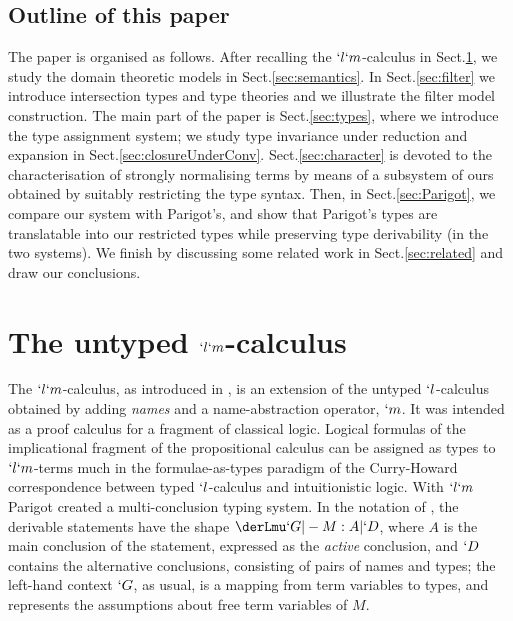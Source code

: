 \documentclass{CSML}
\begin{document}
 \subsection*{Outline of this paper}
The paper is organised as follows. 
After recalling the $`l`m$-calculus in Sect.\skp\ref{sec:calculus}, we study the domain theoretic models in Sect.\skp\ref{sec:semantics}. 
In Sect.\skp\ref{sec:filter} we introduce intersection types and type theories and we illustrate the filter model construction.
The main part of the paper is Sect.\skp\ref{sec:types}, where we introduce the type assignment system; we study type invariance under reduction and expansion in Sect.\skp\ref{sec:closureUnderConv}.
Sect.\skp\ref{sec:character} is devoted to the characterisation of strongly normalising terms by means of a subsystem of ours obtained by suitably restricting the type syntax. 
Then, in Sect.\skp\ref{sec:Parigot}, we compare our system with Parigot's, and show that Parigot's types are translatable into our restricted types while preserving type derivability (in the two systems). 
We finish by discussing some related work in Sect.\skp\ref{sec:related} and draw our conclusions. 

% 

 \section{The untyped \texorpdfstring{$`l`m$}{lambda-mu}-calculus} \label{sec:calculus}
The $`l`m$-calculus, as introduced in \cite{Parigot'92}, is an extension of the untyped $`l$-calculus obtained by adding \emph{names} and a name-abstraction operator, $`m$. 
It was intended as a proof calculus for a fragment of classical logic. 
Logical formulas of the implicational fragment of the propositional calculus can be assigned as types to $`l`m$-terms much in the formulae-as-types paradigm of the Curry-Howard correspondence between typed $`l$-calculus and intuitionistic logic. 
With $`l`m$ Parigot created a multi-conclusion typing system. 
In the notation of \cite{Saurin'08}, the derivable statements have the shape $\derLmu `G |- M : A | `D $, where $A$ is the main conclusion of the statement, expressed as the \emph{active} conclusion, and $`D $ contains the alternative conclusions, consisting of pairs of names and types; the left-hand context $`G$, as usual, is a mapping from term variables to types, and represents the assumptions about free term variables of $M$.
\end{document}
